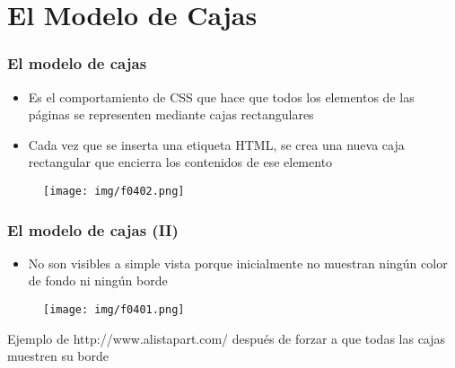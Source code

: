 
\section{El Modelo de Cajas}

\begin{frame}
\frametitle{El modelo de cajas}

\begin{itemize}
  \item Es el comportamiento de CSS que hace que todos los elementos de las páginas se representen mediante cajas rectangulares
  \item  Cada vez que se inserta una etiqueta HTML, se crea una nueva caja rectangular que encierra los contenidos de ese elemento
\end{itemize}


\begin{center}
\begin{figure}[p]
\texttt{[image: img/f0402.png]}
\end{figure}
\end{center}

\end{frame}


\begin{frame}
\frametitle{El modelo de cajas (II)}

\begin{itemize}
  \item No son visibles a simple vista porque inicialmente no muestran ningún color de fondo ni ningún borde
\end{itemize}

\begin{center}
\begin{figure}[p]
\texttt{[image: img/f0401.png]}
\end{figure}
\end{center}
{\footnotesize
Ejemplo de http://www.alistapart.com/ después de forzar a que todas las cajas muestren su borde
}

\end{frame}


